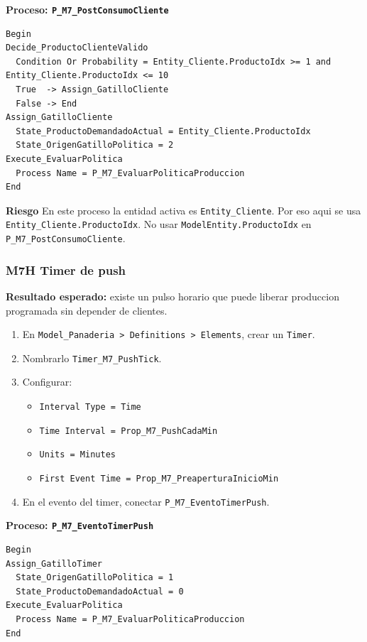 \documentclass[11pt]{article}
\newcommand{\simio}[1]{\texttt{#1}}
\newcommand{\state}[1]{\texttt{#1}}
\newcommand{\proc}[1]{\texttt{#1}}
\newcommand{\risk}{\textcolor{rojoriesgo}{\textbf{Riesgo}}}
\begin{document}
\textbf{Proceso: \proc{P\_M7\_PostConsumoCliente}}

\begin{lstlisting}[caption={Bloques de P M7 PostConsumoCliente}]
Begin
Decide_ProductoClienteValido
  Condition Or Probability = Entity_Cliente.ProductoIdx >= 1 and Entity_Cliente.ProductoIdx <= 10
  True  -> Assign_GatilloCliente
  False -> End
Assign_GatilloCliente
  State_ProductoDemandadoActual = Entity_Cliente.ProductoIdx
  State_OrigenGatilloPolitica = 2
Execute_EvaluarPolitica
  Process Name = P_M7_EvaluarPoliticaProduccion
End
\end{lstlisting}

\risk{} En este proceso la entidad activa es \simio{Entity\_Cliente}. Por eso aqui se usa \state{Entity\_Cliente.ProductoIdx}. No usar \state{ModelEntity.ProductoIdx} en \proc{P\_M7\_PostConsumoCliente}.

\subsubsection{M7H Timer de push}
\textbf{Resultado esperado:} existe un pulso horario que puede liberar produccion programada sin depender de clientes.

\begin{enumerate}
  \item En \simio{Model\_Panaderia > Definitions > Elements}, crear un \simio{Timer}.
  \item Nombrarlo \simio{Timer\_M7\_PushTick}.
  \item Configurar:
  \begin{itemize}
    \item \simio{Interval Type = Time}
    \item \simio{Time Interval = Prop\_M7\_PushCadaMin}
    \item \simio{Units = Minutes}
    \item \simio{First Event Time = Prop\_M7\_PreaperturaInicioMin}
  \end{itemize}
  \item En el evento del timer, conectar \proc{P\_M7\_EventoTimerPush}.
\end{enumerate}

\textbf{Proceso: \proc{P\_M7\_EventoTimerPush}}

\begin{lstlisting}[caption={Bloques de P M7 EventoTimerPush}]
Begin
Assign_GatilloTimer
  State_OrigenGatilloPolitica = 1
  State_ProductoDemandadoActual = 0
Execute_EvaluarPolitica
  Process Name = P_M7_EvaluarPoliticaProduccion
End
\end{lstlisting}
\end{document}
